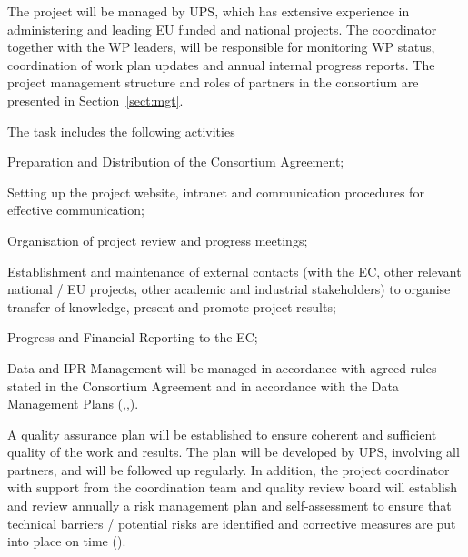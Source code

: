 \begin{workpackage}
\begin{wpdescription}
The project will be managed by UPS, which has extensive experience in
administering and leading EU funded and national projects. The
coordinator together with the WP leaders, will be responsible for
monitoring WP status, coordination of work plan updates and annual
internal progress reports. The project management structure and roles
of partners in the consortium are presented in Section~\ref{sect:mgt}.
\end{wpdescription}

\begin{tasklist}
\begin{task}[title=Project and financial management,
  id=project-finance-management,lead=PS,PM=33,wphases={0-48!.2,0-3,10-12,22-24,34-36,42-48},
  partners={LL,UV,UJF,UB,UO,USH,USO,SA,UW,JU,UK,US,ZH,SR}]
The task includes the following activities
  \begin{compactitem}
  \item Preparation and Distribution of the
    Consortium Agreement;
  \item Setting up the project website, intranet and
    communication procedures for effective communication;
  \item
    Organisation of project review and progress meetings;
  \item
    Establishment and maintenance of external contacts (with the EC,
    other relevant national / EU projects, other academic and
    industrial stakeholders) to organise transfer of knowledge,
    present and promote project results;
  \item Progress and Financial Reporting to the EC;
  \item Data and IPR Management will be managed in accordance with
    agreed rules stated in the Consortium Agreement and in accordance
    with the Data Management Plans
    (,,).
  \end{compactitem}
\end{task}

\begin{task}[title=Quality assurance and risk management,id=project-quality-management,
  wphases=6-48!.3,
  lead=PS,PM=15,partners={LL,UV,UJF,UB,UO,USH,USO,SA,UW,JU,UK,US,ZH,SR}]
  A quality assurance plan will be established to ensure coherent and
  sufficient quality of the work and results. The plan will be
  developed by UPS, involving all partners, and will be followed up
  regularly. In addition, the project coordinator with support from
  the coordination team and quality review board will establish and
  review annually a risk management plan and self-assessment to ensure
  that technical barriers / potential risks are identified and
  corrective measures are put into place on time
  ().
\end{task}


\end{tasklist}
\end{workpackage}
